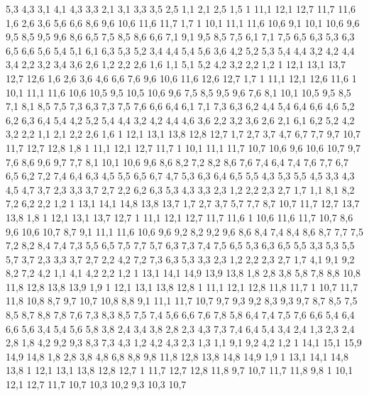 5,3
4,3
%
3,1
4,1
4,3
3,3
%
2,1
3,1
3,3
3,5
2,5
%
1,1
2,1
2,5
1,5
1%
11,1
12,1
12,7
11,7
11,6
%
1,6
2,6
3,6
5,6
6,6
8,6
9,6
10,6
11,6
11,7
1,7
1%
10,1
11,1
11,6
10,6
%
9,1
10,1
10,6
9,6
9,5
%
8,5
9,5
9,6
8,6
%
6,5
7,5
8,5
8,6
6,6
%
7,1
9,1
9,5
8,5
7,5
%
6,1
7,1
7,5
6,5
6,3
%
5,3
6,3
6,5
6,6
5,6
5,4
%
5,1
6,1
6,3
5,3
5,2
%
3,4
4,4
5,4
5,6
3,6
%
4,2
5,2
5,3
5,4
4,4
%
3,2
4,2
4,4
3,4
%
2,2
3,2
3,4
3,6
2,6
%
1,2
2,2
2,6
1,6
%
1,1
5,1
5,2
4,2
3,2
2,2
1,2
1%
12,1
13,1
13,7
12,7
12,6
%
1,6
2,6
3,6
4,6
6,6
7,6
9,6
10,6
11,6
12,6
12,7
1,7
1%
11,1
12,1
12,6
11,6
1%
10,1
11,1
11,6
10,6
10,5
%
9,5
10,5
10,6
9,6
%
7,5
8,5
9,5
9,6
7,6
%
8,1
10,1
10,5
9,5
8,5
%
7,1
8,1
8,5
7,5
7,3
%
6,3
7,3
7,5
7,6
6,6
6,4
%
6,1
7,1
7,3
6,3
6,2
%
4,4
5,4
6,4
6,6
4,6
%
5,2
6,2
6,3
6,4
5,4
%
4,2
5,2
5,4
4,4
%
3,2
4,2
4,4
4,6
3,6
%
2,2
3,2
3,6
2,6
%
2,1
6,1
6,2
5,2
4,2
3,2
2,2
%
1,1
2,1
2,2
2,6
1,6
1%
12,1
13,1
13,8
12,8
12,7
%
1,7
2,7
3,7
4,7
6,7
7,7
9,7
10,7
11,7
12,7
12,8
1,8
1%
11,1
12,1
12,7
11,7
1%
10,1
11,1
11,7
10,7
10,6
%
9,6
10,6
10,7
9,7
%
7,6
8,6
9,6
9,7
7,7
%
8,1
10,1
10,6
9,6
8,6
8,2
%
7,2
8,2
8,6
7,6
7,4
%
6,4
7,4
7,6
7,7
6,7
6,5
%
6,2
7,2
7,4
6,4
6,3
%
4,5
5,5
6,5
6,7
4,7
%
5,3
6,3
6,4
6,5
5,5
%
4,3
5,3
5,5
4,5
%
3,3
4,3
4,5
4,7
3,7
%
2,3
3,3
3,7
2,7
%
2,2
6,2
6,3
5,3
4,3
3,3
2,3
%
1,2
2,2
2,3
2,7
1,7
%
1,1
8,1
8,2
7,2
6,2
2,2
1,2
1%
13,1
14,1
14,8
13,8
13,7
%
1,7
2,7
3,7
5,7
7,7
8,7
10,7
11,7
12,7
13,7
13,8
1,8
1%
12,1
13,1
13,7
12,7
1%
11,1
12,1
12,7
11,7
11,6
1%
10,6
11,6
11,7
10,7
%
8,6
9,6
10,6
10,7
8,7
%
9,1
11,1
11,6
10,6
9,6
9,2
%
8,2
9,2
9,6
8,6
8,4
%
7,4
8,4
8,6
8,7
7,7
7,5
%
7,2
8,2
8,4
7,4
7,3
%
5,5
6,5
7,5
7,7
5,7
%
6,3
7,3
7,4
7,5
6,5
%
5,3
6,3
6,5
5,5
%
3,3
5,3
5,5
5,7
3,7
%
2,3
3,3
3,7
2,7
%
2,2
4,2
7,2
7,3
6,3
5,3
3,3
2,3
%
1,2
2,2
2,3
2,7
1,7
%
4,1
9,1
9,2
8,2
7,2
4,2
%
1,1
4,1
4,2
2,2
1,2
1%
13,1
14,1
14,9
13,9
13,8
%
1,8
2,8
3,8
5,8
7,8
8,8
10,8
11,8
12,8
13,8
13,9
1,9
1%
12,1
13,1
13,8
12,8
1%
11,1
12,1
12,8
11,8
11,7
1%
10,7
11,7
11,8
10,8
%
8,7
9,7
10,7
10,8
8,8
%
9,1
11,1
11,7
10,7
9,7
9,3
9,2
%
8,3
9,3
9,7
8,7
8,5
%
7,5
8,5
8,7
8,8
7,8
7,6
%
7,3
8,3
8,5
7,5
7,4
%
5,6
6,6
7,6
7,8
5,8
%
6,4
7,4
7,5
7,6
6,6
%
5,4
6,4
6,6
5,6
%
3,4
5,4
5,6
5,8
3,8
%
2,4
3,4
3,8
2,8
%
2,3
4,3
7,3
7,4
6,4
5,4
3,4
2,4
%
1,3
2,3
2,4
2,8
1,8
%
4,2
9,2
9,3
8,3
7,3
4,3
%
1,2
4,2
4,3
2,3
1,3
%
1,1
9,1
9,2
4,2
1,2
1%
14,1
15,1
15,9
14,9
14,8
%
1,8
2,8
3,8
4,8
6,8
8,8
9,8
11,8
12,8
13,8
14,8
14,9
1,9
1%
13,1
14,1
14,8
13,8
1%
12,1
13,1
13,8
12,8
12,7
1%
11,7
12,7
12,8
11,8
%
9,7
10,7
11,7
11,8
9,8
1%
10,1
12,1
12,7
11,7
10,7
10,3
10,2
%
9,3
10,3
10,7
